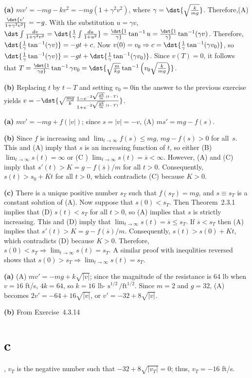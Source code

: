\documentclass[dvips]{book}
\renewcommand{\exer}[1]{\par\medskip\;\noindent{\color{red}\bf #1.}}
\numberwithin{example}{section}
\numberwithin{equation}{section}
\numberwithin{theorem}{section}
\numberwithin{table}{section}
\numberwithin{figure}{section}
\begin{document}
\exer{4.3.12}
{\bf (a)} $mv'=-mg-kv^2=-mg(1+\gamma^2v^2)$, where
$\gamma=\dst{\sqrt{k\over
mg}}$. Therefore,(A)  $\dst{v'\over1+\gamma^2v^2}=-g$. With the
substitution $u=\gamma v$,
 $\dst\int{dv\over1+\gamma^2 v^2}
=\dst{{1\over\gamma}\int{du\over1+u^2}}=\dst{1\over\gamma}\tan^{-1}u=
\dst{1\over\gamma}\tan^{-1}(\gamma v)$.
Therefore,
$\dst{{1\over\gamma}\tan^{-1}(\gamma v)}=-gt+c$. Now
$v(0)=v_0\Rightarrow c=\dst{{1\over\gamma}\tan^{-1}(\gamma v_0)}$, so
$\dst{{1\over\gamma}\tan^{-1}(\gamma v)}=-gt+
\dst{{1\over\gamma}\tan^{-1}(\gamma v_0)}$.
Since $v(T)=0$, it follows that $T=\dst{1\over\gamma g}\tan^{-1}\gamma v_0
=\dst{\sqrt{{m\over kg}}
\tan^{-1}\left(v_0 \sqrt{{k\over mg}}\right)}$.

{\bf (b)} Replacing $t$ by $t-T$ and setting $v_0=0$in the answer to
the previous exercise yields
$v =-\dst{\sqrt{mg\over k} \,
{1-e^{-2\sqrt{gk\over m}\, (t-T)}\over {1+e^{-2\sqrt{gk\over m}\,
(t-T)}}}}$.


\exer{4.3.14}
{\bf (a)} $mv'=-mg+f(|v|)$; since $s=|v|=-v$, (A) $ms'=mg-f(s)$.

{\bf (b)} Since $f$ is increasing and $\lim_{t\to\infty}f(s)\le mg$,
$mg-f(s)>0$ for all~$s$. This and (A) imply that $s$ is an increasing
function of $t$, so either (B) $\lim_{t\to\infty}s(t)=\infty$
or (C ) $\lim_{t\to\infty}s(t)=\overline s<\infty$. However,
(A) and (C) imply that $s'(t)>K=g-f(\overline s)/m$ for all $t>0$.
Consequently, $s(t)>s_0+Kt$ for all $t>0$, which contradicts (C)
because $K>0$.

{\bf (c)} There is a unique positive number $s_T$ such that
$f(s_T)=mg$, and $s\equiv s_T$ is a constant solution of (A).
Now suppose that $s(0)<s_T$. Then Theorem~2.3.1
implies that (D) $s(t)<s_T$ for all $t>0$, so (A) implies that
$s$ is strictly increasing. This and (D) imply that
$\lim_{t\to\infty}s(t)=\overline s\le s_T$. If $\overline s<s_T$
then (A) implies that $s'(t)>K=g-f(\overline s)/m$. Consequently,
$s(t)>s(0)+Kt$, which contradicts (D) because $K>0$. Therefore,
$s(0)<s_T\Rightarrow\lim_{t\to\infty}s(t)=s_T$. A similar proof with
inequlities reversed shows that
$s(0)>s_T\Rightarrow\lim_{t\to\infty}s(t)=s_T$.


\exer{4.3.16}
{\bf (a)} (A) $mv'=-mg+k\sqrt{|v|}$; since the magnitude of the
resistance is 64 lb when $v=16$ ft/s, $4k=64$, so $k=16 \
\mbox{lb$\cdot$ s}^{1/2}/\mbox{ft}^{1/2}$. Since $m=2$ and $g=32$,
(A) becomes $2v'=-64+16\sqrt{|v|}$, or $v'=-32+8\sqrt{|v|}$.

{\bf (b)} From Exercise~4.3.14\part{c}, $v_T$ is the negative
number such that $-32+8\sqrt{|v_T|}=0$; thus, $v_T=-16$ ft/s.
\end{document}
